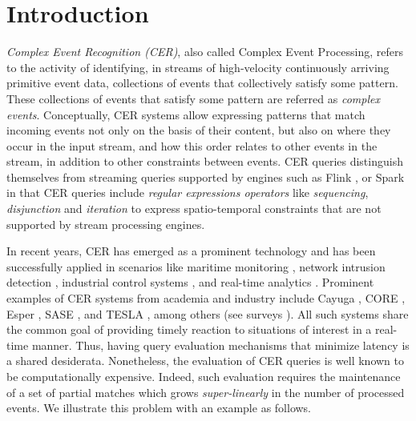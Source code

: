 \chapter{Introduction}\label{chapter:introduction}

\emph{Complex Event Recognition (CER)}, also called Complex Event Processing, refers to the activity of identifying, in streams of high-velocity continuously arriving primitive event data, collections of events that collectively satisfy some pattern.
These collections of events that satisfy some pattern are referred as \emph{complex events}. Conceptually, CER systems allow expressing patterns that match incoming events not only on the basis of their content, but also on where they occur in the input stream, and how this order relates to other events in the stream, in addition to other constraints between events. CER queries distinguish themselves from streaming queries supported by engines such as Flink \cite{flink}, or Spark \cite{spark} in that CER queries include \emph{regular expressions operators} like \emph{sequencing}, \emph{disjunction} and \emph{iteration} to express spatio-temporal constraints that are not supported by stream processing engines.

In recent years, CER has emerged as a prominent technology and has been successfully applied in scenarios like maritime monitoring \cite{maritime-monitoring}, network intrusion detection \cite{network-intrusion-detection}, industrial control systems \cite{industrial-control}, and real-time analytics \cite{real-time-analytics}. Prominent examples of CER systems from academia and industry include Cayuga \cite{cayuga}, CORE \cite{core}, Esper \cite{esper}, SASE \cite{sase}, and TESLA \cite{tesla}, among others (see surveys \cite{survey-systems-1,survey-systems-2}).  All such systems share the common goal of providing timely reaction to situations of interest in a real-time manner. Thus, having query evaluation mechanisms that minimize latency is a shared desiderata. Nonetheless, the evaluation of CER queries is well known to be computationally expensive. Indeed, such evaluation requires the maintenance of a set of partial matches which grows \textit{super-linearly} in the number of processed events. We illustrate this problem with an example as follows.

